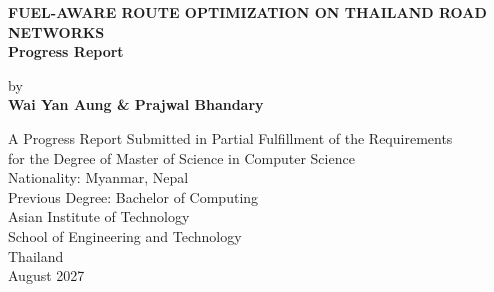 \documentclass[12pt, a4paper, oneside]{report}
\theoremstyle{definition}
\theoremstyle{remark}
\begin{document}
\begin{titlepage}
    \centering
    \vspace*{2cm}
    {\Large\bfseries FUEL-AWARE ROUTE OPTIMIZATION ON THAILAND ROAD NETWORKS\\[0.5em]
    \large Progress Report\par}
    \vspace{2cm}
    {\large by\\[0.5em]
    \textbf{Wai Yan Aung \& Prajwal Bhandary}\par}
    \vspace{1.5cm}
    {\normalsize
    A Progress Report Submitted in Partial Fulfillment of the Requirements\\
    for the Degree of Master of Science in Computer Science\\[1em]
    Nationality: Myanmar, Nepal\\
    Previous Degree: Bachelor of Computing\\[1em]
    Asian Institute of Technology\\
    School of Engineering and Technology\\
    Thailand\\[1em]
    August 2027\par}
    \vfill
\end{titlepage}
\end{document}
